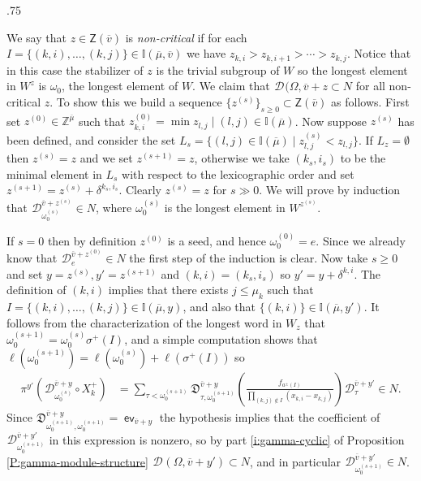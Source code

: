 \documentclass[11pt,fleqn]{amsart}
\makeatletter
\renewcommand\proofname{Proof}
\renewenvironment{proof}[1][\textit{\proofname}]{\par
 \pushQED{\qed}%
 \normalfont \topsep.75\paraskip\relax
 \trivlist
 \item[\hskip\labelsep
 \itshape
 #1\@addpunct{.}]\ignorespaces
}{%
 \popQED\endtrivlist\@endpefalse
}
\newcounter{para}[section]
\newcommand\ZZ{\mathbb Z}
\newcommand\II{\mathbb I}
\newcommand\D[3]{{}^{#1} \mathfrak D_{#2}^{#3}}
\newcommand\DD[3]{{}^{#1} \mathcal D_{#2}^{#3}}
\newcommand\Z{\mathsf Z}
\newcommand\vv{\overline{v}}
\DeclareMathOperator\ev{\mathsf{ev}}
\makeatother
\begin{document}
\begin{proof}
We say that $z \in \Z(\vv)$ is \emph{non-critical} if for each $I = \{(k,i),
\ldots, (k,j)\} \in \II(\overline \mu, \vv)$ we have $z_{k,i} > z_{k,i+1} >
\cdots > z_{k,j}$. Notice that in this case the stabilizer of $z$ is the
trivial subgroup of $W$ so the longest element in $W^z$ is $\omega_0$, the 
longest element of $W$. We claim that $\DD{}{}{}(\Omega, \vv + z \subset N$ 
for all non-critical $z$. To show this we build a sequence $\{z^{(s)}\}_{s 
\geq 0} \subset \Z(\vv)$ as follows. First set $z^{(0)} \in \ZZ^{\overline 
\mu}$ such that $z^{(0)}_{k,i} = \min{z_{l,j} \mid (l,j) \in \II(\overline 
\mu)}$. Now suppose $z^{(s)}$ has been defined, and consider the set $L_s = 
\{(l,j) \in \II(\overline \mu) \mid z^{(s)}_{l,j} < z_{l,j}\}$. If $L_z = 
\emptyset$ then $z^{(s)} = z$ and we set $z^{(s+1)} = z$, otherwise we take 
$(k_s, i_s)$ to be the minimal element in $L_s$ with respect to the 
lexicographic order and set $z^{(s+1)} = z^{(s)} + \delta^{k_s, i_s}$. Clearly 
$z^{(s)} = z$ for $s \gg 0$. We will prove by induction that 
$\DD{}{\omega_0^{(s)}}{\vv + z^{(s)}} \in N$, where $\omega_0^{(s)}$ is the 
longest element in $W^{z^{(s)}}$. 

If $s = 0$ then by definition $z^{(0)}$ is a seed, and hence $\omega_0^{(0)} 
= e$. Since we already know that $\DD{}{e}{\vv + z^{(0)}} \in N$ the first step
of the induction is clear. Now take $s \geq 0$ and set $y = z^{(s)}, y' = 
z^{(s+1)}$ and $(k,i) = (k_s, i_s)$ so $y' = y + \delta^{k,i}$. The definition
of $(k,i)$ implies that there exists $j \leq \mu_k$ such that $I = \{(k,i),
\ldots, (k,j)\} \in \II(\overline \mu, y)$, and also that $\{(k,i)\} \in 
\II(\overline \mu, y')$. It follows from the characterization of the longest 
word in $W_z$ that $\omega_0^{(s+1)} = \omega_0^{(s)} \sigma^+(I)$, and a 
simple computation shows that $\ell(\omega_0^{(s+1)}) = \ell(\omega_0^{(s)})
+ \ell(\sigma^+(I))$ so
\begin{align*}
\pi^{y'} \left( \DD{}{\omega_0^{(s)}}{\vv + y} \circ X_k^+ \right)
	&= \sum_{\tau < \omega_0^{(s+1)}} \D{}{\tau, \omega_0^{(s+1)}}{\vv + y} 
		\left( 
			\frac{f_{a^\pm(I)}}{\displaystyle
					\prod_{(k,j) \notin I} (x_{k,i} - x_{k,j})} 
		\right) \DD{}{\tau}{\vv + y'} \in N.
\end{align*}
Since $\D{}{\omega_0^{(s+1)}, \omega_0^{(s+1)}}{\vv + y} = \ev_{\vv + y}$ the
hypothesis implies that the coefficient of $\DD{}{\omega_0^{(s+1)}}{\vv + y'}$
in this expression is nonzero, so by part \ref{i:gamma-cyclic} of Proposition
\ref{P:gamma-module-structure} $\DD{}{}{}(\Omega, \vv + y') \subset N$, and
in particular $\DD{}{\omega_0^{(s+1)}}{\vv + y'} \in N$.


\end{proof}
\end{document}
